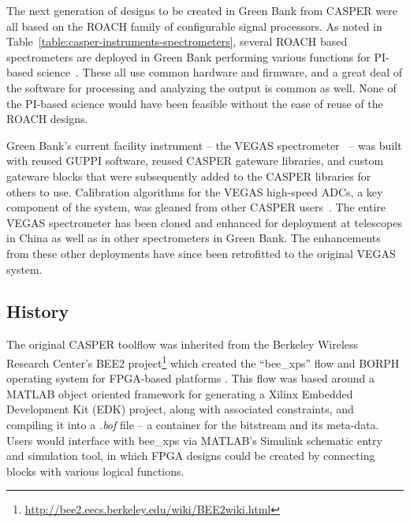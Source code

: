 \documentclass{ws-jai}
\begin{document}
The next generation of designs to be created in Green Bank from CASPER
were all based on the ROACH family of configurable signal processors.
As noted in Table~\ref{table:casper-instruments-spectrometers}, several ROACH based spectrometers
are deployed in Green Bank performing various functions for PI-based
science~\citep[for example]{skynet}.  These all use common
hardware and firmware, and a great deal of the software for processing
and analyzing the output is common as well.  None of the PI-based
science would have been feasible without the ease of reuse of the
ROACH designs.

Green Bank's current facility instrument -- the VEGAS
spectrometer~\citep{chennamangalam2014gpu} -- was built with reused GUPPI
software, reused CASPER gateware libraries, and custom gateware
blocks that were subsequently added to the CASPER libraries for others
to use.  Calibration algorithms for the VEGAS high-speed ADCs, a key component of the system, was gleaned from other
CASPER users~\citep{adc5g}.
The entire VEGAS spectrometer has been cloned and enhanced for
deployment at telescopes in China as well
as in other spectrometers in Green Bank.  The enhancements from these
other deployments have since been retrofitted to the original VEGAS system.

%
%

\subsection{History}
The original CASPER toolflow was inherited from the Berkeley Wireless Research Center's BEE2 project\footnote{\url{http://bee2.eecs.berkeley.edu/wiki/BEE2wiki.html}} which created the ``bee\_xps'' flow and BORPH operating system for FPGA-based platforms \citep{borph1, borph2, borph-thesis}. This flow was based around a MATLAB object oriented framework for generating a Xilinx Embedded Development Kit (EDK) project, along with associated constraints, and compiling it into a \emph{.bof} file -- a container for the bitstream and its meta-data. Users would interface with bee\_xps via MATLAB's Simulink schematic entry and simulation tool, in which FPGA designs could be created by connecting blocks with various logical functions.
\end{document}
